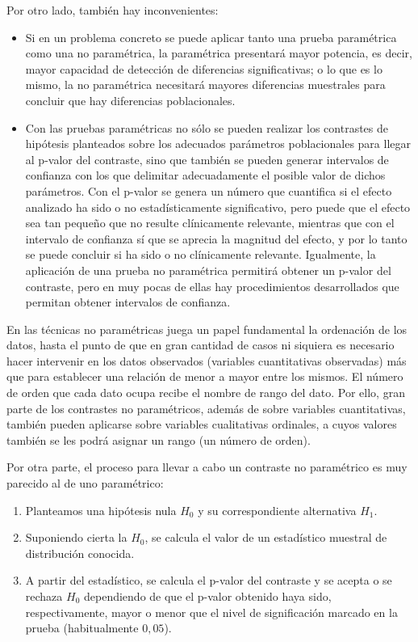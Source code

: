 Por otro lado, también hay inconvenientes:

\begin{itemize}
\item Si en un problema concreto se puede aplicar tanto una prueba paramétrica como una no paramétrica, la paramétrica presentará mayor
potencia, es decir, mayor capacidad de detección de diferencias significativas; o lo que es lo mismo, la no paramétrica necesitará mayores
diferencias muestrales para concluir que hay diferencias poblacionales.

\item Con las pruebas paramétricas no sólo se pueden realizar los contrastes de hipótesis planteados sobre los adecuados parámetros
poblacionales para llegar al p-valor del contraste, sino que también se pueden generar intervalos de confianza con los que delimitar
adecuadamente el posible valor de dichos parámetros. Con el p-valor se genera un número que cuantifica si el efecto analizado ha sido o no
estadísticamente significativo, pero puede que el efecto sea tan pequeño que no resulte clínicamente relevante, mientras que con el
intervalo de confianza sí que se aprecia la magnitud del efecto, y por lo tanto se puede concluir si ha sido o no clínicamente relevante.
Igualmente, la aplicación de una prueba no paramétrica permitirá obtener un p-valor del contraste, pero en muy pocas de ellas hay
procedimientos desarrollados que permitan obtener intervalos de confianza.
\end{itemize}

En las técnicas no paramétricas juega un papel fundamental la ordenación de los datos, hasta el punto de que en gran cantidad de casos ni
siquiera es necesario hacer intervenir en los datos observados (variables cuantitativas observadas) más que para establecer una relación de
menor a mayor entre los mismos. El número de orden que cada dato ocupa recibe el nombre de rango del dato. Por ello, gran parte de los
contrastes no paramétricos, además de sobre variables cuantitativas, también pueden aplicarse sobre variables cualitativas ordinales, a
cuyos valores también se les podrá asignar un rango (un número de orden).

Por otra parte, el proceso para llevar a cabo un contraste no paramétrico es muy parecido al de uno paramétrico:
\begin{enumerate}
\item Planteamos una hipótesis nula $H_0$ y su correspondiente alternativa $H_1$.

\item Suponiendo cierta la $H_0$, se calcula el valor de un estadístico muestral de distribución conocida.

\item A partir del estadístico, se calcula el p-valor del contraste y se acepta o se rechaza $H_0$ dependiendo de que el p-valor obtenido
haya sido, respectivamente, mayor o menor que el nivel de significación marcado en la prueba (habitualmente $0,05$).
\end{enumerate}

